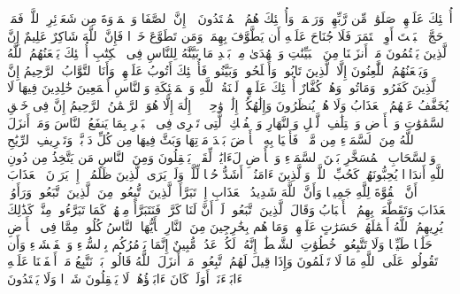 أُو۟لَٰۤئِكَ عَلَیۡهِمۡ صَلَوَٰتࣱ مِّن رَّبِّهِمۡ وَرَحۡمَةࣱۖ وَأُو۟لَٰۤئِكَ هُمُ ٱلۡمُهۡتَدُونَ%
\stopbuffer%
\startbuffer[\q:2:158]
۞ إِنَّ ٱلصَّفَا وَٱلۡمَرۡوَةَ مِن شَعَاۤئِرِ ٱللَّهِۖ فَمَنۡ حَجَّ ٱلۡبَیۡتَ أَوِ ٱعۡتَمَرَ فَلَا جُنَاحَ عَلَیۡهِ أَن یَطَّوَّفَ بِهِمَاۚ وَمَن تَطَوَّعَ خَیۡرࣰا فَإِنَّ ٱللَّهَ شَاكِرٌ عَلِیمٌ%
\stopbuffer%
\startbuffer[\q:2:159]
إِنَّ ٱلَّذِینَ یَكۡتُمُونَ مَاۤ أَنزَلۡنَا مِنَ ٱلۡبَیِّنَٰتِ وَٱلۡهُدَىٰ مِنۢ بَعۡدِ مَا بَیَّنَّٰهُ لِلنَّاسِ فِی ٱلۡكِتَٰبِ أُو۟لَٰۤئِكَ یَلۡعَنُهُمُ ٱللَّهُ وَیَلۡعَنُهُمُ ٱللَّٰعِنُونَ%
\stopbuffer%
\startbuffer[\q:2:160]
إِلَّا ٱلَّذِینَ تَابُوا۟ وَأَصۡلَحُوا۟ وَبَیَّنُوا۟ فَأُو۟لَٰۤئِكَ أَتُوبُ عَلَیۡهِمۡ وَأَنَا ٱلتَّوَّابُ ٱلرَّحِیمُ%
\stopbuffer%
\startbuffer[\q:2:161]
إِنَّ ٱلَّذِینَ كَفَرُوا۟ وَمَاتُوا۟ وَهُمۡ كُفَّارٌ أُو۟لَٰۤئِكَ عَلَیۡهِمۡ لَعۡنَةُ ٱللَّهِ وَٱلۡمَلَٰۤئِكَةِ وَٱلنَّاسِ أَجۡمَعِینَ%
\stopbuffer%
\startbuffer[\q:2:162]
خَٰلِدِینَ فِیهَا لَا یُخَفَّفُ عَنۡهُمُ ٱلۡعَذَابُ وَلَا هُمۡ یُنظَرُونَ%
\stopbuffer%
\startbuffer[\q:2:163]
وَإِلَٰهُكُمۡ إِلَٰهࣱ وَٰحِدࣱۖ لَّاۤ إِلَٰهَ إِلَّا هُوَ ٱلرَّحۡمَٰنُ ٱلرَّحِیمُ%
\stopbuffer%
\startbuffer[\q:2:164]
إِنَّ فِی خَلۡقِ ٱلسَّمَٰوَٰتِ وَٱلۡأَرۡضِ وَٱخۡتِلَٰفِ ٱلَّیۡلِ وَٱلنَّهَارِ وَٱلۡفُلۡكِ ٱلَّتِی تَجۡرِی فِی ٱلۡبَحۡرِ بِمَا یَنفَعُ ٱلنَّاسَ وَمَاۤ أَنزَلَ ٱللَّهُ مِنَ ٱلسَّمَاۤءِ مِن مَّاۤءࣲ فَأَحۡیَا بِهِ ٱلۡأَرۡضَ بَعۡدَ مَوۡتِهَا وَبَثَّ فِیهَا مِن كُلِّ دَاۤبَّةࣲ وَتَصۡرِیفِ ٱلرِّیَٰحِ وَٱلسَّحَابِ ٱلۡمُسَخَّرِ بَیۡنَ ٱلسَّمَاۤءِ وَٱلۡأَرۡضِ لَءَایَٰتࣲ لِّقَوۡمࣲ یَعۡقِلُونَ%
\stopbuffer%
\startbuffer[\q:2:165]
وَمِنَ ٱلنَّاسِ مَن یَتَّخِذُ مِن دُونِ ٱللَّهِ أَندَادࣰا یُحِبُّونَهُمۡ كَحُبِّ ٱللَّهِۖ وَٱلَّذِینَ ءَامَنُوۤا۟ أَشَدُّ حُبࣰّا لِّلَّهِۗ وَلَوۡ یَرَى ٱلَّذِینَ ظَلَمُوۤا۟ إِذۡ یَرَوۡنَ ٱلۡعَذَابَ أَنَّ ٱلۡقُوَّةَ لِلَّهِ جَمِیعࣰا وَأَنَّ ٱللَّهَ شَدِیدُ ٱلۡعَذَابِ%
\stopbuffer%
\startbuffer[\q:2:166]
إِذۡ تَبَرَّأَ ٱلَّذِینَ ٱتُّبِعُوا۟ مِنَ ٱلَّذِینَ ٱتَّبَعُوا۟ وَرَأَوُا۟ ٱلۡعَذَابَ وَتَقَطَّعَتۡ بِهِمُ ٱلۡأَسۡبَابُ%
\stopbuffer%
\startbuffer[\q:2:167]
وَقَالَ ٱلَّذِینَ ٱتَّبَعُوا۟ لَوۡ أَنَّ لَنَا كَرَّةࣰ فَنَتَبَرَّأَ مِنۡهُمۡ كَمَا تَبَرَّءُوا۟ مِنَّاۗ كَذَٰلِكَ یُرِیهِمُ ٱللَّهُ أَعۡمَٰلَهُمۡ حَسَرَٰتٍ عَلَیۡهِمۡۖ وَمَا هُم بِخَٰرِجِینَ مِنَ ٱلنَّارِ%
\stopbuffer%
\startbuffer[\q:2:168]
یَٰۤأَیُّهَا ٱلنَّاسُ كُلُوا۟ مِمَّا فِی ٱلۡأَرۡضِ حَلَٰلࣰا طَیِّبࣰا وَلَا تَتَّبِعُوا۟ خُطُوَٰتِ ٱلشَّیۡطَٰنِۚ إِنَّهُۥ لَكُمۡ عَدُوࣱّ مُّبِینٌ%
\stopbuffer%
\startbuffer[\q:2:169]
إِنَّمَا یَأۡمُرُكُم بِٱلسُّوۤءِ وَٱلۡفَحۡشَاۤءِ وَأَن تَقُولُوا۟ عَلَى ٱللَّهِ مَا لَا تَعۡلَمُونَ%
\stopbuffer%
\startbuffer[\q:2:170]
وَإِذَا قِیلَ لَهُمُ ٱتَّبِعُوا۟ مَاۤ أَنزَلَ ٱللَّهُ قَالُوا۟ بَلۡ نَتَّبِعُ مَاۤ أَلۡفَیۡنَا عَلَیۡهِ ءَابَاۤءَنَاۤۚ أَوَلَوۡ كَانَ ءَابَاۤؤُهُمۡ لَا یَعۡقِلُونَ شَیۡءࣰا وَلَا یَهۡتَدُونَ%

